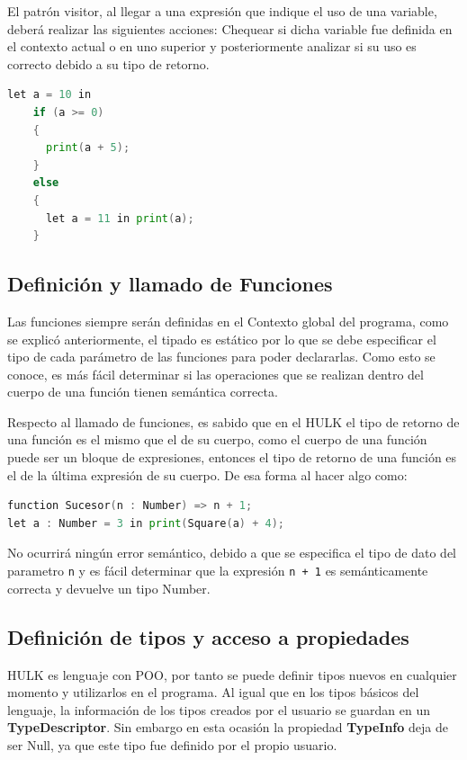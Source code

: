 \documentclass[11pt, a4paper, twoside]{article} %
\begin{document}
El patr\'on visitor, al llegar a una expresi\'on que indique el uso de una variable, deber\'a realizar las siguientes acciones: Chequear si dicha variable fue definida en el 
contexto actual o en uno superior y posteriormente analizar si su uso es correcto debido a su tipo de retorno.\\

\begin{lstlisting}[language=Go]
  let a = 10 in
    if (a >= 0)
    {
      print(a + 5);
    }
    else
    {
      let a = 11 in print(a);
    }
\end{lstlisting}

\subsection{Definici\'on y llamado de Funciones}
Las funciones siempre ser\'an definidas en el Contexto global del programa, como se explic\'o anteriormente, el tipado es est\'atico por lo que se debe especificar el tipo de cada 
par\'ametro de las funciones para poder declararlas. Como esto se conoce, es m\'as f\'acil determinar si las operaciones que se realizan dentro del cuerpo de una funci\'on 
tienen sem\'antica correcta.

Respecto al llamado de funciones, es sabido que en el HULK el tipo de retorno de una funci\'on es el mismo que el de su cuerpo, como el cuerpo de una funci\'on
puede ser un bloque de expresiones, entonces el tipo de retorno de una funci\'on es el de la \'ultima expresi\'on de su cuerpo. De esa forma al hacer algo como:\\

\begin{lstlisting}[language=Go]
function Sucesor(n : Number) => n + 1;
let a : Number = 3 in print(Square(a) + 4);
\end{lstlisting}

No ocurrir\'a ning\'un error sem\'antico, debido a que se especifica el tipo de dato del parametro \texttt{n} y es f\'acil determinar que la expresi\'on
\texttt{n + 1} es sem\'anticamente correcta y devuelve un tipo Number.

\subsection{Definici\'on de tipos y acceso a propiedades}
HULK es lenguaje con POO, por tanto se puede definir tipos nuevos en cualquier momento y utilizarlos en el programa. Al igual que en los tipos
b\'asicos del lenguaje, la informaci\'on de los tipos creados por el usuario se guardan en un \textbf{TypeDescriptor}. Sin embargo en esta ocasi\'on
la propiedad \textbf{TypeInfo} deja de ser Null, ya que este tipo fue definido por el propio usuario.
\end{document}
